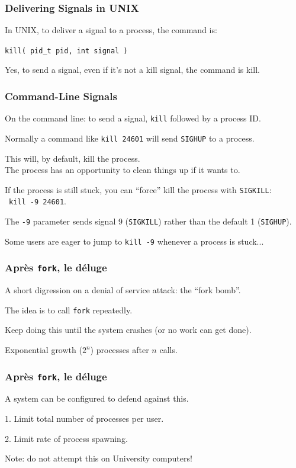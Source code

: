 \begin{frame}
\frametitle{Delivering Signals in UNIX}

In UNIX, to deliver a signal to a process, the command is:

\texttt{kill( pid\_t pid, int signal )}

Yes, to send a signal, even if it's not a kill signal, the command is kill. 

\end{frame}




\begin{frame}
\frametitle{Command-Line Signals}

On the command line: to send a signal, \texttt{kill} followed by a process ID. 

Normally a command like \texttt{kill 24601} will send \texttt{SIGHUP} to a process.

This will, by default, kill the process.\\
\quad The process has an opportunity to clean things up if it wants to. 

If the process is still stuck, you can ``force'' kill the process with \texttt{SIGKILL}:\\\ \quad \texttt{kill -9 24601}. 

The \texttt{-9} parameter sends signal 9 (\texttt{SIGKILL}) rather than the default 1 (\texttt{SIGHUP}). 

Some users are eager to jump to \texttt{kill -9} whenever a process is stuck...
\end{frame}



\begin{frame}
\frametitle{Apr\`{e}s \texttt{fork}, le d\'{e}luge}

A short digression on a denial of service attack: the ``fork bomb''.

The idea is to call \texttt{fork} repeatedly.

Keep doing this until the system crashes (or no work can get done).

Exponential growth ($2^n$) processes after $n$ calls.

\end{frame}


\begin{frame}
\frametitle{Apr\`{e}s \texttt{fork}, le d\'{e}luge}
A system can be configured to defend against this.

1. Limit total number of processes per user.

2. Limit rate of process spawning.

Note: do not attempt this on University computers!

\end{frame}




